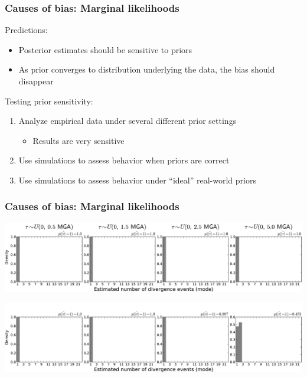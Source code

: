 \begin{frame}
    \frametitle{Causes of bias: Marginal likelihoods}
    Predictions:\\
    \begin{itemize}
        \item Posterior estimates should be sensitive to priors
        \item As prior converges to distribution underlying the data, the
            bias should disappear
    \end{itemize}
    Testing prior sensitivity: \\
    \begin{enumerate}
        \item Analyze empirical data under several different prior settings
            \begin{itemize}
                \item Results are very sensitive
            \end{itemize}
        \item Use simulations to assess behavior when priors are correct
        \item<2-> Use simulations to assess behavior under ``ideal'' real-world priors
    \end{enumerate}
\end{frame}

\begin{frame}[t]
    \frametitle{Causes of bias: Marginal likelihoods}
    \vspace{1cm}
        \centerline{
        \includegraphics[width=\textwidth]{images/old-sims_power_psi_mode.pdf}}
        \vspace{0mm}
        \centerline{
        \includegraphics[width=\textwidth]{images/old-sims-inform10_power_psi_mode_headless.pdf}}
\end{frame}


